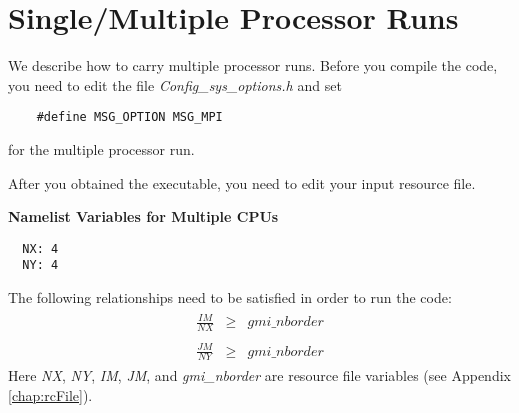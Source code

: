 \chapter[Single/Multiple Processor Runs]{Single/Multiple Processor Runs} 
\label{chap:proc_runs}

We describe how to carry multiple processor runs.
Before you compile the code, you need to edit the file
{\em Config\_sys\_options.h} and set
%
\begin{verbatim}
    #define MSG_OPTION MSG_MPI
\end{verbatim}
%
for the multiple processor run.

After you obtained the executable, you need to edit your input
resource file.

\vskip 0.5cm

{\bf Namelist Variables for Multiple CPUs} \newline
%
\begin{verbatim}
  NX: 4
  NY: 4
\end{verbatim}
%
The following relationships need to be satisfied in order to run the code:
%
\begin{eqnarray*}
\begin{array}{rcl}
\frac{IM}{NX} & \ge & gmi\_nborder \\
               &   &      \\
\frac{JM}{NY} & \ge & gmi\_nborder
\end{array}
\end{eqnarray*}
%
Here {\em NX}, {\em NY}, {\em IM}, {\em JM}, and {\em gmi\_nborder} are
resource file variables (see Appendix \ref{chap:rcFile}).
